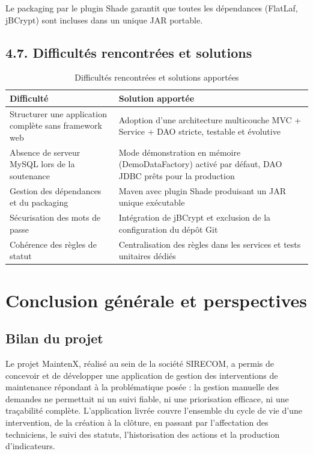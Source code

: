 \documentclass[11pt,a4paper]{report}
\begin{document}
Le packaging par le plugin Shade garantit que toutes les dépendances (FlatLaf, jBCrypt) sont incluses dans un unique JAR portable.
\section*{4.7. Difficultés rencontrées et solutions}
\begin{table}[htbp]\centering\small
\begin{tabularx}{\textwidth}{|p{3.8cm}|X|}
\hline\rowcolor{hdr}\textbf{Difficulté} & \textbf{Solution apportée}\\ \hline
Structurer une application complète sans framework web & Adoption d'une architecture multicouche MVC + Service + DAO stricte, testable et évolutive\\ \hline
Absence de serveur MySQL lors de la soutenance & Mode démonstration en mémoire (DemoDataFactory) activé par défaut, DAO JDBC prêts pour la production\\ \hline
Gestion des dépendances et du packaging & Maven avec plugin Shade produisant un JAR unique exécutable\\ \hline
Sécurisation des mots de passe & Intégration de jBCrypt et exclusion de la configuration du dépôt Git\\ \hline
Cohérence des règles de statut & Centralisation des règles dans les services et tests unitaires dédiés\\ \hline
\end{tabularx}
\caption{Difficultés rencontrées et solutions apportées}
\end{table}
\chapter*{Conclusion générale et perspectives}
\section*{Bilan du projet}

Le projet MaintenX, réalisé au sein de la société SIRECOM, a permis de concevoir et de développer une application de gestion des interventions de maintenance répondant à la problématique posée : la gestion manuelle des demandes ne permettait ni un suivi fiable, ni une priorisation efficace, ni une traçabilité complète. L'application livrée couvre l'ensemble du cycle de vie d'une intervention, de la création à la clôture, en passant par l'affectation des techniciens, le suivi des statuts, l'historisation des actions et la production d'indicateurs.
\end{document}
